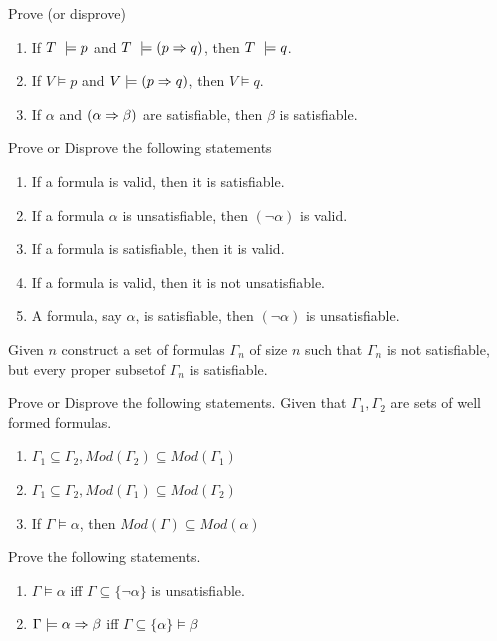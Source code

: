 \begin{exercise}
Prove (or disprove)
\begin{enumerate}
\item If $T ~\models p$ and $T ~\models (p \Rightarrow q)$, then $T ~\models q$.
\item If $V \models p$ and $V  \models (p \Rightarrow q)$, then $V \models q$.
\item If $\alpha$ and $(\alpha \Rightarrow \beta)$ are satisfiable, then $\beta$ is satisfiable.
\end{enumerate}
\end{exercise}

\begin{exercise}
Prove or Disprove the following statements
\begin{enumerate}
\item If a formula is valid, then it is satisfiable.
\item If a formula $\alpha$ is unsatisfiable, then $(\neg \alpha)$ is valid.
\item If a formula is satisfiable, then it is valid.
\item If a formula is valid, then it is not unsatisfiable.
\item A formula, say $\alpha$, is satisfiable, then $(\neg \alpha)$ is unsatisfiable.
\end{enumerate}
\end{exercise}

\begin{exercise}
Given $n$ construct a set of formulas $\Gamma_n$ of size $n$ such that $\Gamma_n$ is not satisfiable, but every proper subsetof $\Gamma_n$ is satisfiable.
\end{exercise}

\begin{exercise}
Prove or Disprove the following statements. Given that $\Gamma_1,\Gamma_2$ are sets of well formed formulas. 
\begin{enumerate}
\item $\Gamma_1 \subseteq \Gamma_2, Mod(\Gamma_2) \subseteq Mod(\Gamma_1)$
\item $\Gamma_1 \subseteq \Gamma_2, Mod(\Gamma_1) \subseteq Mod(\Gamma_2)$
\item If $\Gamma \models \alpha$, then $Mod(\Gamma) \subseteq Mod(\alpha)$
\end{enumerate}
\end{exercise}

\begin{exercise}
Prove the following statements.
\begin{enumerate}
\item $\Gamma \models \alpha$ iff $\Gamma \subseteq \{\neg \alpha \}$ is unsatisfiable. 
\item  $\Gamma \models \alpha \Rightarrow \beta$ iff $\Gamma \subseteq \{\alpha\} \models \beta$
\end{enumerate}
\end{exercise}


